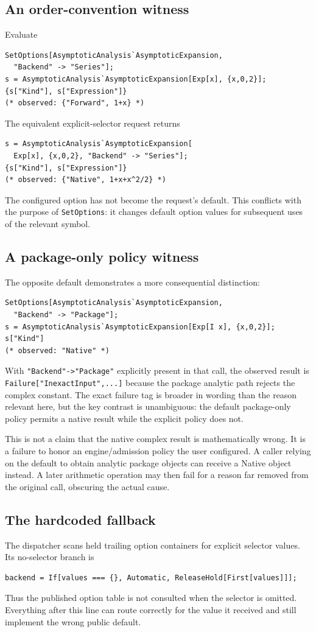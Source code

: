 \documentclass[11pt,letterpaper]{article}
\newcommand{\code}[1]{\nolinkurl{#1}}
\begin{document}
\subsection{An order-convention witness}
Evaluate
\begin{lstlisting}
SetOptions[AsymptoticAnalysis`AsymptoticExpansion,
  "Backend" -> "Series"];
s = AsymptoticAnalysis`AsymptoticExpansion[Exp[x], {x,0,2}];
{s["Kind"], s["Expression"]}
(* observed: {"Forward", 1+x} *)
\end{lstlisting}
The equivalent explicit-selector request returns
\begin{lstlisting}
s = AsymptoticAnalysis`AsymptoticExpansion[
  Exp[x], {x,0,2}, "Backend" -> "Series"];
{s["Kind"], s["Expression"]}
(* observed: {"Native", 1+x+x^2/2} *)
\end{lstlisting}
The configured option has not become the request's default. This conflicts
with the purpose of \code{SetOptions}: it changes default option values for
subsequent uses of the relevant symbol.~\cite{wl-setoptions}

\subsection{A package-only policy witness}
The opposite default demonstrates a more consequential distinction:
\begin{lstlisting}
SetOptions[AsymptoticAnalysis`AsymptoticExpansion,
  "Backend" -> "Package"];
s = AsymptoticAnalysis`AsymptoticExpansion[Exp[I x], {x,0,2}];
s["Kind"]
(* observed: "Native" *)
\end{lstlisting}
With \code{"Backend"->"Package"} explicitly present in that call, the observed
result is \code{Failure["InexactInput",...]} because the package analytic path
rejects the complex constant. The exact failure tag is broader in wording than
the reason relevant here, but the key contrast is unambiguous: the default
package-only policy permits a native result while the explicit policy does not.

This is not a claim that the native complex result is mathematically wrong.
It is a failure to honor an engine/admission policy the user configured. A
caller relying on the default to obtain analytic package objects can receive a
Native object instead. A later arithmetic operation may then fail for a reason
far removed from the original call, obscuring the actual cause.

\subsection{The hardcoded fallback}
The dispatcher scans held trailing option containers for explicit selector
values. Its no-selector branch is
\begin{lstlisting}
backend = If[values === {}, Automatic, ReleaseHold[First[values]]];
\end{lstlisting}
Thus the published option table is not consulted when the selector is omitted.
Everything after this line can route correctly for the value it received and
still implement the wrong public default.~\cite{compatibility}
\end{document}
